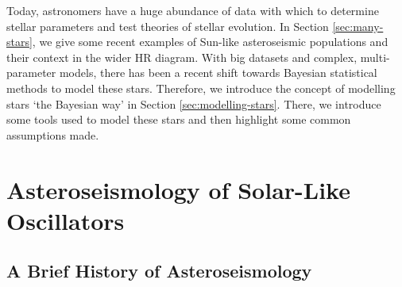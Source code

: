 Today, astronomers have a huge abundance of data with which to determine stellar parameters and test theories of stellar evolution. In Section \ref{sec:many-stars}, we give some recent examples of Sun-like asteroseismic populations and their context in the wider HR diagram. With big datasets and complex, multi-parameter models, there has been a recent shift towards Bayesian statistical methods to model these stars. Therefore, we introduce the concept of modelling stars `the Bayesian way' in Section \ref{sec:modelling-stars}. There, we introduce some tools used to model these stars and then highlight some common assumptions made.





\section[Solar-Like Oscillators]{Asteroseismology of Solar-Like Oscillators}\label{sec:seismo}


\subsection{A Brief History of Asteroseismology}

